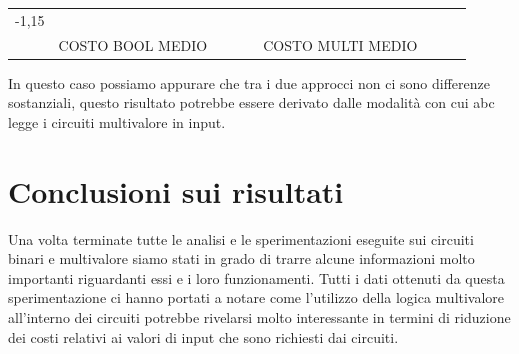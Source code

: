 \documentclass[
]{book}
\begin{document}
\begin{longtable}[]{@{}lllllllll@{}}
\begin{minipage}[t]{0.07\columnwidth}
-1,15\strut
\end{minipage}\tabularnewline
\begin{minipage}[t]{0.07\columnwidth}\raggedright
\strut
\end{minipage} & \begin{minipage}[t]{0.11\columnwidth}\raggedright
COSTO BOOL MEDIO\strut
\end{minipage} & \begin{minipage}[t]{0.08\columnwidth}\raggedright
\strut
\end{minipage} & \begin{minipage}[t]{0.07\columnwidth}\raggedright
\strut
\end{minipage} & \begin{minipage}[t]{0.09\columnwidth}\raggedright
\strut
\end{minipage} & \begin{minipage}[t]{0.12\columnwidth}\raggedright
COSTO MULTI MEDIO\strut
\end{minipage} & \begin{minipage}[t]{0.08\columnwidth}\raggedright
\strut
\end{minipage} & \begin{minipage}[t]{0.07\columnwidth}\raggedright
\strut
\end{minipage} & \begin{minipage}[t]{0.07\columnwidth}\raggedright
\strut
\end{minipage}\tabularnewline
\bottomrule
\end{longtable}

In questo caso possiamo appurare che tra i due approcci non ci sono differenze sostanziali, questo risultato potrebbe essere derivato dalle modalità con cui abc legge i circuiti multivalore in input.

\newpage

\hypertarget{conclusioni-sui-risultati}{%
\section{Conclusioni sui risultati}\label{conclusioni-sui-risultati}}

Una volta terminate tutte le analisi e le sperimentazioni eseguite sui circuiti binari e multivalore siamo stati in grado di trarre alcune informazioni molto importanti riguardanti essi e i loro funzionamenti. Tutti i dati ottenuti da questa sperimentazione ci hanno portati a notare come l'utilizzo della logica multivalore all'interno dei circuiti potrebbe rivelarsi molto interessante in termini di riduzione dei costi relativi ai valori di input che sono richiesti dai circuiti.
\end{document}
